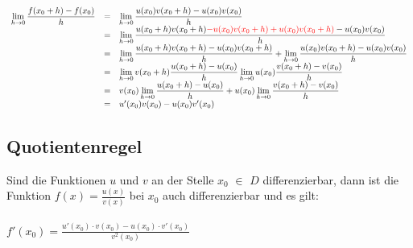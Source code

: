 \begin{Beweis}
$
\begin{array}{rcl}
\lim\limits_{h \rightarrow 0} {\dfrac{f(x_{0}+h)-f(x_{0})}{h}} & = & \lim\limits_{h \rightarrow 0} {\dfrac{u(x_{0})v({x_{0}+h)-u(x_{0})v(x_{0})}}{h}}\\
&=&\lim\limits_{h \rightarrow 0} {\dfrac{u(x_{0}+h)v(x_{0}+h)\textcolor{red}{-u(x_{0})v(x_{0}+h)+u(x_{0})v(x_{0}+h)}-u(x_{0})v(x_{0}) }{h}}\\
&=&\lim\limits_{h \rightarrow 0} {\dfrac{u(x_{0}+h)v(x_{0}+h)-u(x_{0})v(x_{0}+h)}{h}} + \lim\limits_{h \rightarrow 0} {\dfrac{u(x_{0})v(x_{0}+h)-u(x_{0})v(x_{0})}{h}}\\
&=&\lim\limits_{h \rightarrow 0} {v(x_{0}+h)\dfrac{u(x_{0}+h)-u(x_{0})}{h}} \lim\limits_{h \rightarrow 0} {u(x_{0})\dfrac{v(x_{0}+h)-v(x_{0})}{h}}\\
&=& v(x_{0})\lim\limits_{h \rightarrow 0}{\dfrac{u(x_{0}+h)-u(x_{0})}{h}} +u(x_{0}) \lim\limits_{h \rightarrow 0} {\dfrac{v(x_{0}+h)-v(x_{0})}{h}}\\
&=& u'(x_{0})v(x_{0}) - u(x_{0})v'(x_{0}) 
\end{array}
$
\end{Beweis}

\subsection{Quotientenregel}

Sind die Funktionen $u$ und $v$ an der Stelle $x_{0}$ $\in$ $D$ differenzierbar, dann ist die Funktion $f(x)=\frac{u(x)} {v(x)}$ bei $x_{0}$ auch differenzierbar und es gilt: \\
\\
$f'(x_{0})=\frac{u'(x_{0})\cdot v(x_{0})-u(x_{0})\cdot v'(x_{0})}{v^2(x_{0})}$\\

